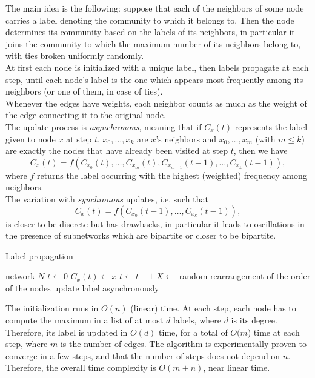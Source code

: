 \documentclass[a4paper,11pt]{book}
\begin{document}
The main idea is the following: suppose that each of the neighbors of some node carries a label denoting the community to which it belongs to. Then the node determines its community based on the labels of its neighbors, in particular it joins the community to which the maximum number of its neighbors belong to, with ties broken uniformly randomly.\\
At first each node is initialized with a unique label, then labels propagate at each step, until each node's label is the one which appears most frequently among its neighbors (or one of them, in case of ties).\\
Whenever the edges have weights, each neighbor counts as much as the weight of the edge connecting it to the original node.\\

The update process is \textit{asynchronous}, meaning that if $C_x(t)$ represents the label given to node $x$ at step $t$, $x_0,\ldots,x_k$ are $x$'s neighbors and $x_0,\ldots,x_m$ (with $m\leq k$) are exactly the nodes that have already been visited at step $t$, then we have
$$
C_x(t) = f(C_{x_0}(t),\ldots,C_{x_m}(t),C_{x_{m+1}}(t-1),\ldots,C_{x_k}(t-1)),
$$
where $f$ returns the label occurring with the highest (weighted) frequency among neighbors.\\

The variation with \textit{synchronous} updates, i.e. such that
$$
C_x(t) = f(C_{x_0}(t-1),\ldots,C_{x_k}(t-1)),
$$
is closer to be discrete but has drawbacks, in particular it leads to oscillations in the presence of subnetworks which are bipartite or closer to be bipartite.
\begin{algorithm*}
\caption{Label propagation}
\begin{algorithmic}[1]
\Require network $N$
\State $t\gets 0$
\State $C_x(t)\gets x$
\EndFor
\Repeat
\State $t\gets t+1$
\State $X\gets$ random rearrangement of the order of the nodes
\State update label asynchronously
\EndFor
{}
\end{algorithmic}
\end{algorithm*}

The initialization runs in $O(n)$ (linear) time. At each step, each node has to compute the maximum in a list of at most $d$ labels, where $d$ is its degree. Therefore, its label is updated in $O(d)$ time, for a total of $O(m$) time at each step, where $m$ is the number of edges. The algorithm is experimentally proven to converge in a few steps, and that the number of steps does not depend on $n$. Therefore, the overall time complexity is $O(m+n)$, near linear time.
\newpage
\end{document}
